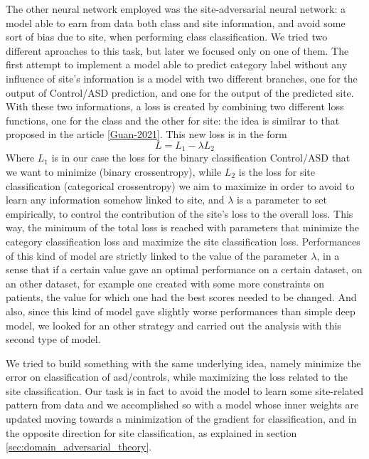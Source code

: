 \documentclass[12pt]{report}
\begin{document}
The other neural network employed was the site-adversarial neural network: a model able to earn from data both class and site information, and avoid some sort of bias due to site, when performing class classification.
We tried two different aproaches to this task, but later we focused only on one of them.
The first attempt to implement a model able to predict category label without any influence of site's information is a model with two different branches, one for the output of Control/ASD prediction, and one for the output of the predicted site.
With these two informations, a loss is created by combining two different loss functions, one for the class and the other for site: the idea is similrar to that proposed in the article \ref{Guan-2021}.
This new loss is in the form
\begin{equation}
L = L_1 - \lambda L_2
\end{equation}
Where $L_1$  is in our case the loss for the binary classification Control/ASD that we want to minimize (binary crossentropy), while $L_2$ is the loss for site classification (categorical crossentropy) we aim to maximize in order to avoid to learn any information somehow linked to site, and $\lambda $ is a parameter to set empirically, to control the contribution of the site's loss to the overall loss.
This way, the minimum of the total loss is reached with parameters that minimize the category classification loss and maximize the site classification loss.
Performances of this kind of model are strictly linked to the value of the parameter $\lambda$, in a sense that if a certain value gave an optimal performance on a certain dataset, on an other dataset, for example one created with some more constraints on patients, the value for which one had the best scores needed to be changed.
And also, since this kind of model gave slightly worse performances than simple deep model, we looked for an other strategy and carried out the analysis with this second type of model.

We tried to build something with the same underlying idea, namely minimize the error on classification of asd/controls, while maximizing the loss related to the site classification.
Our task is in fact to avoid the model to learn some site-related pattern from data and we accomplished so with a model whose inner weights are updated moving towards a minimization of the gradient for classification, and in the opposite direction for site classification, as explained in section \ref{sec:domain_adversarial_theory}.
\end{document}
